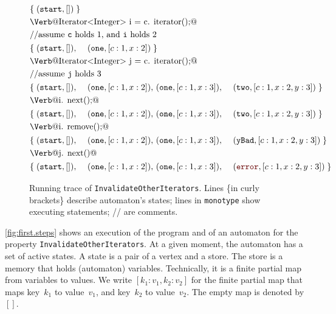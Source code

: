 \documentclass{sigplanconf}[10pt] %
\newcommand{\error}{\ensuremath{\textcolor{darkred}{\mathtt{error}}}\xspace}
\newcommand{\start}{\ensuremath{\mathtt{start}}\xspace}
\begin{document}
\begin{figure}[t]
{\def\s#1{\text{\Verb@#1@}}
 \def\m#1{\PY{n+na}{#1}}
 \def\t#1{\mathtt{#1}}
\begin{align*}
&\{\;(\start,[])\;\} \\
&\s{Iterator<Integer> i = c.\m{iterator}();}  \\
&\text{//assume {\tt c} holds $1$, and {\tt i} holds $2$ } \\
& \begin{aligned}
  \{\;&(\start,[]),\
      &(\t{one},[c:1,x:2])\;\}
  \end{aligned}\\
&\s{Iterator<Integer> j = c.\m{iterator}();}  \\
&\text{//assume {\tt j} holds $3$} \\
& \begin{aligned}
  \{\;&(\start,[]),\
      &(\t{one},[c:1,x:2]),\
      &(\t{one},[c:1,x:3]),\
      &(\t{two},[c:1,x:2,y:3])\;\}
  \end{aligned}\\
&\s{i.\m{next}();} \\
& \begin{aligned}
  \{\;&(\start,[]),\
      &(\t{one},[c:1,x:2]),\
      &(\t{one},[c:1,x:3]),\
      &(\t{two},[c:1,x:2,y:3])\;\}
  \end{aligned}\\
&\s{i.\m{remove}();} \\
& \begin{aligned}
  \{\;&(\start,[]),\
      &(\t{one},[c:1,x:2]),\
      &(\t{one},[c:1,x:3]),\
      &(\t{yBad},[c:1,x:2,y:3])\;\}
  \end{aligned}\\
&\s{j.\m{next}()} \\
& \begin{aligned}
  \{\;&(\start,[]),\
      &(\t{one},[c:1,x:2]),\
      &(\t{one},[c:1,x:3]),\
      &(\error,[c:1,x:2,y:3])\;\}
  \end{aligned}\\
\end{align*}}
\caption{Running trace of {\tt InvalidateOtherIterators}. Lines \{in curly brackets\} describe automaton's states;
lines in \texttt{monotype} show executing statements;
// are comments.}
\label{fig:first.steps}
\end{figure} %
\autoref{fig:first.steps} shows an execution of the program and of an automaton for the property \texttt{InvalidateOtherIterators}.
At a given moment, the automaton has a set of active states.
A state is a pair of a vertex and a store.
The store is a memory that holds (automaton) variables.
Technically, it is a finite partial map from variables to values.
We write $[k_1:v_1,k_2:v_2]$ for the finite partial map that maps key~$k_1$ to value~$v_1$, and key~$k_2$ to value~$v_2$.
The empty map is denoted by~$[]$.
\end{document}
